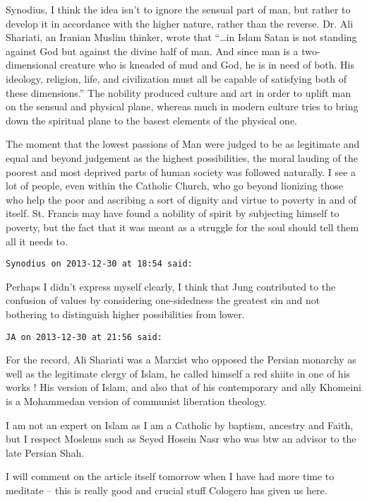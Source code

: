\begin{footnotesize}
\begin{sffamily}
Synodius, I think the idea isn't to ignore the sensual part of man, but rather to develop it in accordance with the higher nature, rather than the reverse. Dr. Ali Shariati, an Iranian Muslim thinker, wrote that “…in Islam Satan is not standing against God but against the divine half of man. And since man is a two-dimensional creature who is kneaded of mud and God, he is in need of both. His ideology, religion, life, and civilization must all be capable of satisfying both of these dimensions.” The nobility produced culture and art in order to uplift man on the sensual and physical plane, whereas much in modern culture tries to bring down the spiritual plane to the basest elements of the physical one. 

The moment that the lowest passions of Man were judged to be as legitimate and equal and beyond judgement as the highest possibilities, the moral lauding of the poorest and most deprived parts of human society was followed naturally. I see a lot of people, even within the Catholic Church, who go beyond lionizing those who help the poor and ascribing a sort of dignity and virtue to poverty in and of itself. St. Francis may have found a nobility of spirit by subjecting himself to poverty, but the fact that it was meant as a struggle for the soul should tell them all it needs to.


\hfill

\texttt{Synodius on 2013-12-30 at 18:54 said: }

Perhaps I didn't express myself clearly, I think that Jung contributed to the confusion of values by considering one-sidedness the greatest sin and not bothering to distinguish higher possibilities from lower.


\hfill

\texttt{JA on 2013-12-30 at 21:56 said: }

For the record, Ali Shariati was a Marxist who opposed the Persian monarchy as well as the legitimate clergy of Islam, he called himself a red shiite in one of his works ! His version of Islam, and also that of his contemporary and ally Khomeini is a Mohammedan version of communist liberation theology.

I am not an expert on Islam as I am a Catholic by baptism, ancestry and Faith, but I respect Moslems such as Seyed Hosein Nasr who was btw an advisor to the late Persian Shah. 

I will comment on the article itself tomorrow when I have had more time to meditate – this is really good and crucial stuff Cologero has given us here.



\end{sffamily}
\end{footnotesize}
